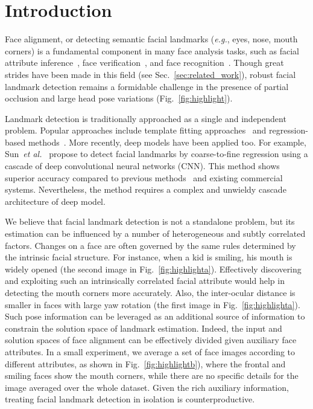 \documentclass[10pt,journal,compsoc]{IEEEtran}
\newcommand{\etal}{\emph{et al.}}
\newcommand{\eg}{\emph{e.g.}}
\begin{document}
\section{Introduction}
\label{sec:introduction}
Face alignment, or detecting semantic facial landmarks (\eg, eyes, nose, mouth corners) is a fundamental component in many face analysis tasks, such as facial attribute inference~\cite{kumarattribute}, face verification~\cite{LuT14}, and face recognition~\cite{huang2013coupling}. Though great strides have been made in this field (see Sec.~\ref{sec:related_work}), robust facial landmark detection remains a formidable challenge in the presence of partial occlusion and large head pose variations (Fig.~\ref{fig:highlight}).

Landmark detection is traditionally approached as a single and independent problem. Popular approaches include template fitting approaches~\cite{Cootes2001,Zhu2012,Yu2013,tzimiropoulos2014gauss} and regression-based methods~\cite{dollar13,Cao2012,Cootes2012,yang2013sieving,zhang2014coarse}. More recently, deep models have been applied too. For example, Sun~\etal~\cite{Sun2013} propose to detect facial landmarks by coarse-to-fine regression using a cascade of deep convolutional neural networks (CNN). This method shows superior accuracy compared to previous methods~\cite{Belhumeur2011,Cao2012} and existing commercial systems. Nevertheless, the method requires a complex and unwieldy cascade architecture of deep model.

We believe that facial landmark detection is not a standalone problem, but its estimation can be influenced by a number of heterogeneous and subtly correlated factors. Changes on a face are often governed by the same rules determined by the intrinsic facial structure.
For instance, when a kid is smiling, his mouth is widely opened (the second image in Fig.~\ref{fig:highlighta}). Effectively discovering and exploiting such an intrinsically correlated facial attribute would help in detecting the mouth corners more accurately. Also, the inter-ocular distance is smaller in faces with large yaw rotation (the first image in Fig.~\ref{fig:highlighta}). Such pose information can be leveraged as an additional source of information to constrain the solution space of landmark estimation.
Indeed, the input and solution spaces of face alignment can be effectively divided given auxiliary face attributes. In a small experiment, we average a set of face images according to different attributes, as shown in Fig.~\ref{fig:highlightb}), where the frontal and smiling faces show the mouth corners, while there are no specific details for the image averaged over the whole dataset.
Given the rich auxiliary information, treating facial landmark detection in isolation is counterproductive.
\end{document}
